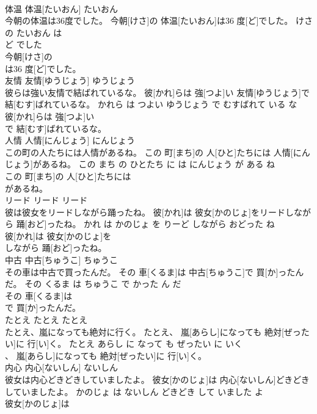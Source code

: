 \documentclass[8pt]{extreport}
\begin{document}
\begin{CJK}{UTF8}{min}
\\	体温	体温[たいおん]	たいおん	
\\	今朝の体温は36度でした。	今朝[けさ]の 体温[たいおん]は36 度[ど]でした。	けさ の たいおん は 
\\	ど でした	
\\	今朝[けさ]の
\\	は36 度[ど]でした。			
\\	友情	友情[ゆうじょう]	ゆうじょう	
\\	彼らは強い友情で結ばれているな。	彼[かれ]らは 強[つよ]い 友情[ゆうじょう]で 結[むす]ばれているな。	かれら は つよい ゆうじょう で むすばれて いる な	
\\	彼[かれ]らは 強[つよ]い
\\	で 結[むす]ばれているな。			
\\	人情	人情[にんじょう]	にんじょう	
\\	この町の人たちには人情があるね。	この 町[まち]の 人[ひと]たちには 人情[にんじょう]があるね。	この まち の ひとたち に は にんじょう が ある ね	
\\	この 町[まち]の 人[ひと]たちには
\\	があるね。			
\\	リード	リード	リード	
\\	彼は彼女をリードしながら踊ったね。	彼[かれ]は 彼女[かのじょ]をリードしながら 踊[おど]ったね。	かれ は かのじょ を りーど しながら おどった ね	
\\	彼[かれ]は 彼女[かのじょ]を
\\	しながら 踊[おど]ったね。			
\\	中古	中古[ちゅうこ]	ちゅうこ	
\\	その車は中古で買ったんだ。	その 車[くるま]は 中古[ちゅうこ]で 買[か]ったんだ。	その くるま は ちゅうこ で かった ん だ	
\\	その 車[くるま]は
\\	で 買[か]ったんだ。			
\\	たとえ	たとえ	たとえ	
\\	たとえ、嵐になっても絶対に行く。	たとえ、 嵐[あらし]になっても 絶対[ぜったい]に 行[い]く。	たとえ あらし に なって も ぜったい に いく	
\\	、 嵐[あらし]になっても 絶対[ぜったい]に 行[い]く。			
\\	内心	内心[ないしん]	ないしん	
\\	彼女は内心どきどきしていましたよ。	彼女[かのじょ]は 内心[ないしん]どきどきしていましたよ。	かのじょ は ないしん どきどき して いました よ	
\\	彼女[かのじょ]は

\end{CJK}
\end{document}
